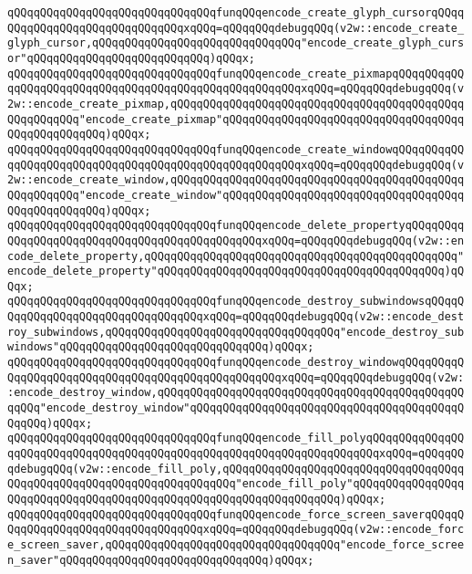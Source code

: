 \verb|qQQqqQQqqQQqqQQqqQQqqQQqqQQqqQQqfunqQQqencode_create_glyph_cursorqQQqqQQqqQQqqQQqqQQqqQQqqQQqqQQqxqQQq=qQQqqQQqdebugqQQq(v2w::encode_create_glyph_cursor,qQQqqQQqqQQqqQQqqQQqqQQqqQQqqQQq"encode_create_glyph_cursor"qQQqqQQqqQQqqQQqqQQqqQQqqQQq)qQQqx;|\newline
\verb|qQQqqQQqqQQqqQQqqQQqqQQqqQQqqQQqfunqQQqencode_create_pixmapqQQqqQQqqQQqqQQqqQQqqQQqqQQqqQQqqQQqqQQqqQQqqQQqqQQqqQQqxqQQq=qQQqqQQqdebugqQQq(v2w::encode_create_pixmap,qQQqqQQqqQQqqQQqqQQqqQQqqQQqqQQqqQQqqQQqqQQqqQQqqQQqqQQq"encode_create_pixmap"qQQqqQQqqQQqqQQqqQQqqQQqqQQqqQQqqQQqqQQqqQQqqQQqqQQq)qQQqx;|\newline
\verb|qQQqqQQqqQQqqQQqqQQqqQQqqQQqqQQqfunqQQqencode_create_windowqQQqqQQqqQQqqQQqqQQqqQQqqQQqqQQqqQQqqQQqqQQqqQQqqQQqqQQqxqQQq=qQQqqQQqdebugqQQq(v2w::encode_create_window,qQQqqQQqqQQqqQQqqQQqqQQqqQQqqQQqqQQqqQQqqQQqqQQqqQQqqQQq"encode_create_window"qQQqqQQqqQQqqQQqqQQqqQQqqQQqqQQqqQQqqQQqqQQqqQQqqQQq)qQQqx;|\newline
\verb|qQQqqQQqqQQqqQQqqQQqqQQqqQQqqQQqfunqQQqencode_delete_propertyqQQqqQQqqQQqqQQqqQQqqQQqqQQqqQQqqQQqqQQqqQQqqQQqxqQQq=qQQqqQQqdebugqQQq(v2w::encode_delete_property,qQQqqQQqqQQqqQQqqQQqqQQqqQQqqQQqqQQqqQQqqQQqqQQq"encode_delete_property"qQQqqQQqqQQqqQQqqQQqqQQqqQQqqQQqqQQqqQQqqQQq)qQQqx;|\newline
\verb|qQQqqQQqqQQqqQQqqQQqqQQqqQQqqQQqfunqQQqencode_destroy_subwindowsqQQqqQQqqQQqqQQqqQQqqQQqqQQqqQQqqQQqxqQQq=qQQqqQQqdebugqQQq(v2w::encode_destroy_subwindows,qQQqqQQqqQQqqQQqqQQqqQQqqQQqqQQqqQQq"encode_destroy_subwindows"qQQqqQQqqQQqqQQqqQQqqQQqqQQqqQQq)qQQqx;|\newline
\verb|qQQqqQQqqQQqqQQqqQQqqQQqqQQqqQQqfunqQQqencode_destroy_windowqQQqqQQqqQQqqQQqqQQqqQQqqQQqqQQqqQQqqQQqqQQqqQQqqQQqxqQQq=qQQqqQQqdebugqQQq(v2w::encode_destroy_window,qQQqqQQqqQQqqQQqqQQqqQQqqQQqqQQqqQQqqQQqqQQqqQQqqQQq"encode_destroy_window"qQQqqQQqqQQqqQQqqQQqqQQqqQQqqQQqqQQqqQQqqQQqqQQq)qQQqx;|\newline
\verb|qQQqqQQqqQQqqQQqqQQqqQQqqQQqqQQqfunqQQqencode_fill_polyqQQqqQQqqQQqqQQqqQQqqQQqqQQqqQQqqQQqqQQqqQQqqQQqqQQqqQQqqQQqqQQqqQQqqQQqxqQQq=qQQqqQQqdebugqQQq(v2w::encode_fill_poly,qQQqqQQqqQQqqQQqqQQqqQQqqQQqqQQqqQQqqQQqqQQqqQQqqQQqqQQqqQQqqQQqqQQqqQQq"encode_fill_poly"qQQqqQQqqQQqqQQqqQQqqQQqqQQqqQQqqQQqqQQqqQQqqQQqqQQqqQQqqQQqqQQqqQQq)qQQqx;|\newline
\verb|qQQqqQQqqQQqqQQqqQQqqQQqqQQqqQQqfunqQQqencode_force_screen_saverqQQqqQQqqQQqqQQqqQQqqQQqqQQqqQQqqQQqxqQQq=qQQqqQQqdebugqQQq(v2w::encode_force_screen_saver,qQQqqQQqqQQqqQQqqQQqqQQqqQQqqQQqqQQq"encode_force_screen_saver"qQQqqQQqqQQqqQQqqQQqqQQqqQQqqQQq)qQQqx;|\newline
